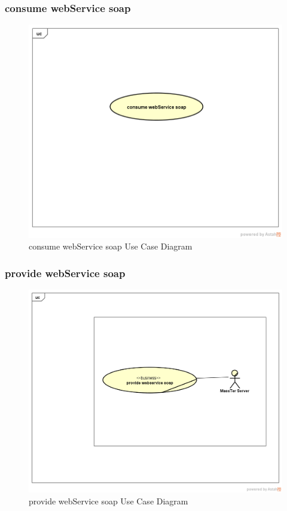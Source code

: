 \documentclass[12pt]{article}
\begin{document}
	 \subsubsection{consume webService soap}
	 	 	\begin{figure}[h]
	 	\centering
	 	\includegraphics[width=1.0\textwidth]{consumewebServicesoap.png}
	 	\caption{consume webService soap Use Case Diagram}
	 	
	 \end{figure}
 \clearpage
 \newpage

	 \subsubsection{provide webService soap} 
	 	\begin{figure}[h]
	 	\centering
	 	\includegraphics[width=1.0\textwidth]{provideWebServiceSoap.png}
	 	\caption{provide webService soap Use Case Diagram}
	 	
	 \end{figure}
 \clearpage
 \newpage
\end{document}
